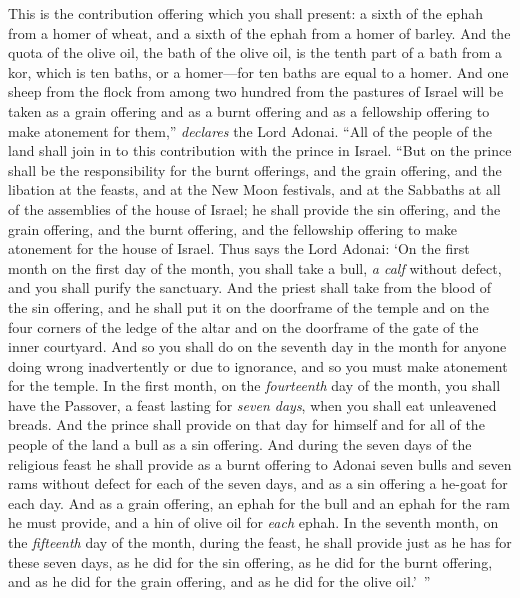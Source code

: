\begin{biblechapter}
\verse This is the contribution offering which you shall present: a sixth of the ephah from a homer of wheat, and a sixth of the ephah from a homer of barley.
\verse And the quota of the olive oil, the bath of the olive oil, is the tenth part of a bath from a kor, which is ten baths, or a homer—for ten baths are equal to a homer.
\verse And one sheep from the flock from among two hundred from the pastures of Israel will be taken as a grain offering and as a burnt offering and as a fellowship offering to make atonement for them,” \textit{declares} the Lord Adonai.
\verse “All of the people of the land shall join in to this contribution with the prince in Israel.
\verse “But on the prince shall be the responsibility for the burnt offerings, and the grain offering, and the libation at the feasts, and at the New Moon festivals, and at the Sabbaths at all of the assemblies of the house of Israel; he shall provide the sin offering, and the grain offering, and the burnt offering, and the fellowship offering to make atonement for the house of Israel.
\verse Thus says the Lord Adonai: ‘On the first month on the first day of the month, you shall take a bull, \textit{a calf} without defect, and you shall purify the sanctuary.
\verse And the priest shall take from the blood of the sin offering, and he shall put it on the doorframe of the temple and on the four corners of the ledge of the altar and on the doorframe of the gate of the inner courtyard.
\verse And so you shall do on the seventh day in the month for anyone doing wrong inadvertently or due to ignorance, and so you must make atonement for the temple.
\verse In the first month, on the \textit{fourteenth} day of the month, you shall have the Passover, a feast lasting for \textit{seven days}, when you shall eat unleavened breads.
\verse And the prince shall provide on that day for himself and for all of the people of the land a bull as a sin offering.
\verse And during the seven days of the religious feast he shall provide as a burnt offering to Adonai seven bulls and seven rams without defect for each of the seven days, and as a sin offering a he-goat for each day.
\verse And as a grain offering, an ephah for the bull and an ephah for the ram he must provide, and a hin of olive oil for \textit{each} ephah.
\verse In the seventh month, on the \textit{fifteenth} day of the month, during the feast, he shall provide just as he has for these seven days, as he did for the sin offering, as he did for the burnt offering, and as he did for the grain offering, and as he did for the olive oil.’ ”
\end{biblechapter}

